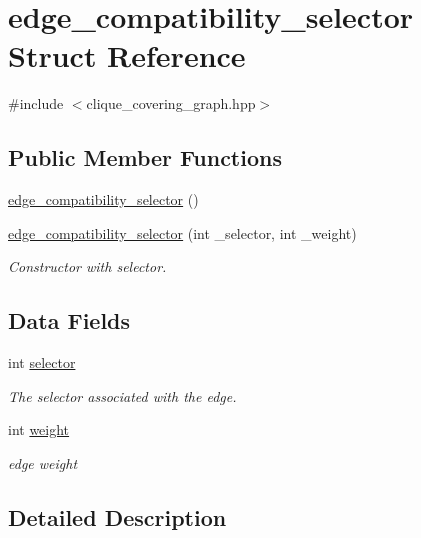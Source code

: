 \hypertarget{structedge__compatibility__selector}{}\section{edge\+\_\+compatibility\+\_\+selector Struct Reference}
\label{structedge__compatibility__selector}


{\ttfamily \#include $<$clique\+\_\+covering\+\_\+graph.\+hpp$>$}

\subsection*{Public Member Functions}
\begin{DoxyCompactItemize}
\item 
\hyperlink{structedge__compatibility__selector_ad3b0c8c0e8676dafbdc63411427a1848}{edge\+\_\+compatibility\+\_\+selector} ()
\item 
\hyperlink{structedge__compatibility__selector_a3f9afbd8ff1c9f93c26d9e197592ac8e}{edge\+\_\+compatibility\+\_\+selector} (int \+\_\+selector, int \+\_\+weight)
\begin{DoxyCompactList}\small\item\em Constructor with selector. \end{DoxyCompactList}\end{DoxyCompactItemize}
\subsection*{Data Fields}
\begin{DoxyCompactItemize}
\item 
int \hyperlink{structedge__compatibility__selector_aefa2ed746b66dbb338f27726b2681ec4}{selector}
\begin{DoxyCompactList}\small\item\em The selector associated with the edge. \end{DoxyCompactList}\item 
int \hyperlink{structedge__compatibility__selector_a41b75fa94fa11ccdd3515e3adb138134}{weight}
\begin{DoxyCompactList}\small\item\em edge weight \end{DoxyCompactList}\end{DoxyCompactItemize}


\subsection{Detailed Description}


